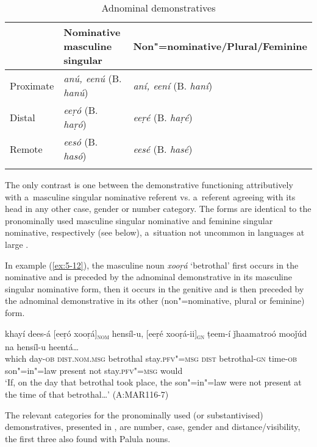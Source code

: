 \begin{table}[ht]
\caption{Adnominal demonstratives}
\begin{tabularx}{\textwidth}{ l@{\hspace{30pt}} Q Q }
\lsptoprule
&
Nominative masculine singular &
Non"=nominative/{\allowbreak}Plural/{\allowbreak}Feminine\\\hline
Proximate &
\textit{anú, eenú} (B. \textit{hanú}) &
\textit{aní, eení} (B. \textit{haní})\\
Distal &
\textit{eeṛó} (B. \textit{haṛó}) &
\textit{eeṛé} (B. \textit{haṛé})\\
Remote &
\textit{eesó} (B. \textit{hasó}) &
\textit{eesé} (B. \textit{hasé})\\\lspbottomrule
\end{tabularx}
\label{tab:5-3}
\end{table}

The only contrast is one between the demonstrative functioning attributively with a~masculine singular nominative referent vs. a~referent agreeing with its head in any other case, gender or number category. The forms are identical to the pronominally used masculine singular nominative and feminine singular nominative, respectively (see below), a~situation not uncommon in languages at large \citep[214]{himmelmann1996}. 


In example (\ref{ex:5-12}), the masculine noun \textit{xooṛá} `betrothal' first occurs in the nominative and is preceded by the adnominal demonstrative in its masculine singular nominative form, then it occurs in the genitive and is then preceded by the adnominal demonstrative in its other (non"=nominative, plural or feminine) form.


\begin{exe}
\ex
\label{ex:5-12}
\gll khayí dees-á [eeṛó xooṛá]\textsc{\textsubscript{nom}} hensíl-u, [eeṛé
 xooṛá-ii]\textsc{\textsubscript{gn}} ṭeem-í ǰhaamatroó mooǰúd na hensíl-u
heentá{\dots} \\
which day-\textsc{ob} \textsc{dist.nom.msg} betrothal stay.\textsc{pfv"=msg}
\textsc{dist} betrothal-\textsc{gn} time-\textsc{ob} son"=in"=law present not stay.\textsc{pfv"=msg} would\\
\glt `If, on the day that betrothal took place, the son"=in"=law were not present at the time of that betrothal{\ldots}' (A:MAR116-7)
\end{exe}

The relevant categories for the pronominally used (or substantivised) demonstratives, presented in
, are number, case, gender and distance/visibility, the first three also found with Palula
nouns.

